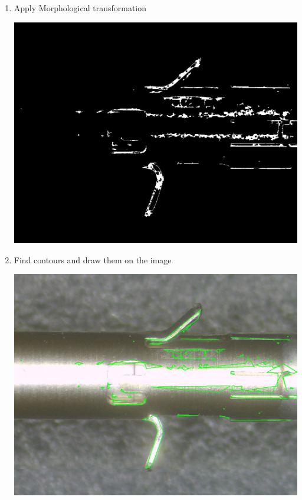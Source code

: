 \begin{enumerate}
\begin{enumerate}
\begin{center}
\end{center}
\pagebreak
\item Apply Morphological transformation
\begin{center}
\includegraphics[width=\textwidth]{mophor.png}
\end{center}
\pagebreak
\item Find contours and draw them on the image
\begin{center}
\includegraphics[width=\textwidth]{contours.png}
\end{center}
\end{enumerate}
\end{enumerate}
